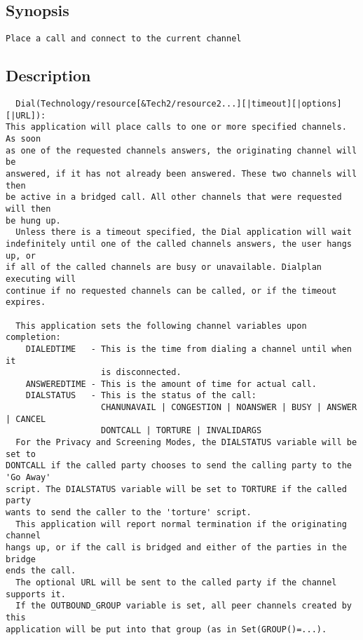 \subsection{Synopsis}
\begin{verbatim}
Place a call and connect to the current channel
\end{verbatim}
\subsection{Description}
\begin{verbatim}
  Dial(Technology/resource[&Tech2/resource2...][|timeout][|options][|URL]):
This application will place calls to one or more specified channels. As soon
as one of the requested channels answers, the originating channel will be
answered, if it has not already been answered. These two channels will then
be active in a bridged call. All other channels that were requested will then
be hung up.
  Unless there is a timeout specified, the Dial application will wait
indefinitely until one of the called channels answers, the user hangs up, or
if all of the called channels are busy or unavailable. Dialplan executing will
continue if no requested channels can be called, or if the timeout expires.

  This application sets the following channel variables upon completion:
    DIALEDTIME   - This is the time from dialing a channel until when it
                   is disconnected.
    ANSWEREDTIME - This is the amount of time for actual call.
    DIALSTATUS   - This is the status of the call:
                   CHANUNAVAIL | CONGESTION | NOANSWER | BUSY | ANSWER | CANCEL
                   DONTCALL | TORTURE | INVALIDARGS
  For the Privacy and Screening Modes, the DIALSTATUS variable will be set to
DONTCALL if the called party chooses to send the calling party to the 'Go Away'
script. The DIALSTATUS variable will be set to TORTURE if the called party
wants to send the caller to the 'torture' script.
  This application will report normal termination if the originating channel
hangs up, or if the call is bridged and either of the parties in the bridge
ends the call.
  The optional URL will be sent to the called party if the channel supports it.
  If the OUTBOUND_GROUP variable is set, all peer channels created by this
application will be put into that group (as in Set(GROUP()=...).


\end{verbatim}
